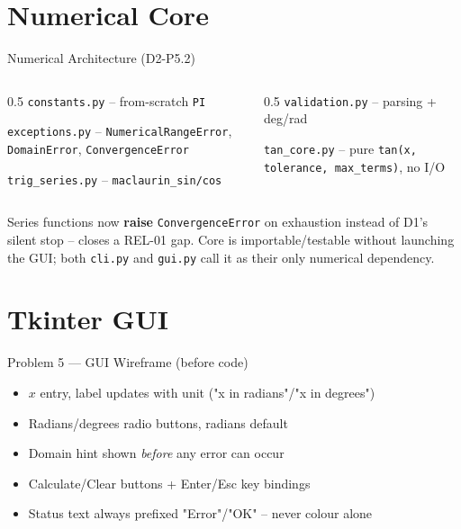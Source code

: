 \documentclass[10pt]{beamer}
\begin{document}
\section{Numerical Core}
\begin{frame}{Numerical Architecture (D2-P5.2)}
  \begin{columns}
    \begin{column}{0.5\textwidth}
      \texttt{constants.py} -- from-scratch \texttt{PI}

      \texttt{exceptions.py} -- \texttt{NumericalRangeError}, \texttt{DomainError}, \texttt{ConvergenceError}

      \texttt{trig\_series.py} -- \texttt{maclaurin\_sin/cos}
    \end{column}
    \begin{column}{0.5\textwidth}
      \texttt{validation.py} -- parsing + deg/rad

      \texttt{tan\_core.py} -- pure \texttt{tan(x, tolerance, max\_terms)}, no I/O
    \end{column}
  \end{columns}
  \vspace{0.3cm}
  Series functions now \textbf{raise} \texttt{ConvergenceError} on exhaustion instead of D1's silent stop -- closes a REL-01 gap.
  \vspace{0.2cm}
  Core is importable/testable without launching the GUI; both \texttt{cli.py} and \texttt{gui.py} call it as their only numerical dependency.
\end{frame}

\section{Tkinter GUI}
\begin{frame}{Problem 5 --- GUI Wireframe (before code)}
  \begin{itemize}
    \item $x$ entry, label updates with unit ("x in radians"/"x in degrees")
    \item Radians/degrees radio buttons, radians default
    \item Domain hint shown \emph{before} any error can occur
    \item Calculate/Clear buttons + Enter/Esc key bindings
    \item Status text always prefixed "Error"/"OK" -- never colour alone
  \end{itemize}
\end{frame}
\end{document}
